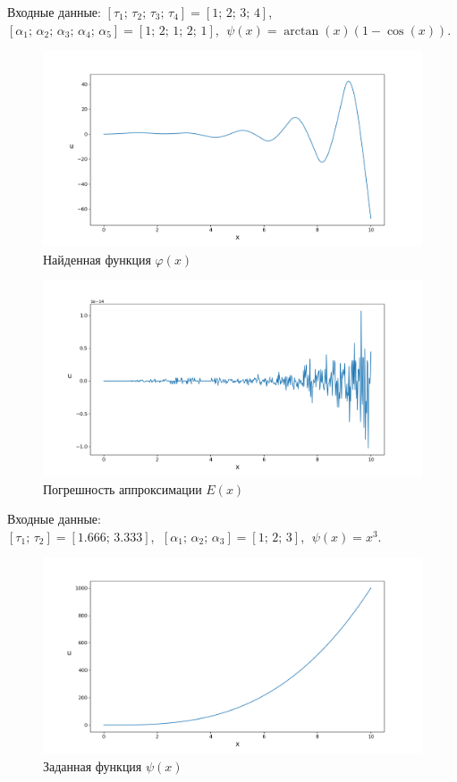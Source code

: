 \documentclass{article}
\theoremstyle{definition}
\begin{document}
Входные данные: 
$[\tau_1;\, \tau_2;\, \tau_3;\, \tau_4] = [1;\, 2;\, 3;\, 4]$, \\[1mm]
$[\alpha_1;\, \alpha_2;\, \alpha_3;\, \alpha_4;\, \alpha_5] = [1;\, 2;\, 1;\, 2;\, 1]$, 
$\;\psi(x) = \arctan(x)(1 - \cos(x))$.
\begin{figure}[H]
	\centering
	\includegraphics[trim={2.15cm, 0, 0, 1.5cm}, clip, scale=0.618]{6_u0.png}
	\caption{Найденная функция $\varphi(x)$}
	\label{fig:image18}
\end{figure}

\begin{figure}[H]
	\centering
	\includegraphics[trim={2.15cm, 0, 0, 1.5cm}, clip, scale=0.618]{6_E.png}
	\caption{Погрешность аппроксимации $E(x)$}
	\label{fig:image19}
\end{figure}

Входные данные: \\
$[\tau_1;\, \tau_2] = [1.666;\, 3.333]$, 
$\;[\alpha_1;\, \alpha_2;\, \alpha_3] = [1;\, 2;\, 3]$,
$\;\psi(x) = x^3$.
\begin{figure}[H]
	\centering
	\includegraphics[trim={2.475cm, 0, 0, 1.5cm}, clip, scale=0.624]{789_psi.png}
	\caption{Заданная функция $\psi(x)$}
	\label{fig:image20}
\end{figure}
\end{document}
